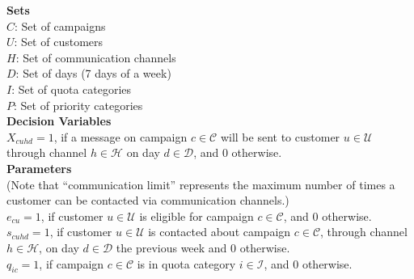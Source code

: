 \documentclass[11pt]{article}
\begin{document}
\begin{singlespace}
\noindent \textbf{Sets}\\

\noindent ${C}$: Set of campaigns \\
\noindent ${U}$: Set of customers \\
\noindent ${H}$: Set of communication channels \\
\noindent ${D}$: Set of days (7 days of a week) \\
\noindent ${I}$: Set of quota categories \\
\noindent ${P}$: Set of priority categories \\



\noindent \textbf{Decision Variables}\\

\noindent $X_{{c}{u}{h}{d}}=1$, if a message on campaign $c \in \mathcal{C}$ will be sent to customer $u \in \mathcal{U}$ through channel $h \in \mathcal{H}$ on day $d \in \mathcal{D}$, and 0 otherwise.\\

\noindent \textbf{Parameters}\\

\noindent (Note that ``communication limit'' represents the maximum number of times a customer can be contacted via communication channels.) \\

\noindent $e_{{c}{u}}=1$, if customer $u \in \mathcal{U}$ is eligible for campaign $c \in \mathcal{C}$, and 0 otherwise.\\

\noindent $s_{{c}{u}{h}{d}}=1$, if customer $u \in \mathcal{U}$ is contacted about campaign $c \in \mathcal{C}$, through channel $h \in \mathcal{H}$, on day $d \in \mathcal{D}$ the previous week and 0 otherwise.\\

\noindent $q_{{i}{c}}=1$, if campaign $c \in \mathcal{C}$ is in quota category $i \in \mathcal{I}$, and 0 otherwise.\\


\end{singlespace}
\end{document}
